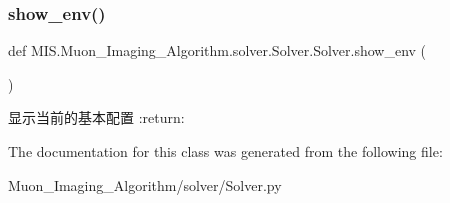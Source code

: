 \subsubsection{\texorpdfstring{show\+\_\+env()}{show\_env()}}
{\footnotesize\ttfamily def M\+I\+S.\+Muon\+\_\+\+Imaging\+\_\+\+Algorithm.\+solver.\+Solver.\+Solver.\+show\+\_\+env (\begin{DoxyParamCaption}{ }\end{DoxyParamCaption})\hspace{0.3cm}{\ttfamily [static]}}

\begin{DoxyVerb}显示当前的基本配置
:return:
\end{DoxyVerb}
 

The documentation for this class was generated from the following file\+:\begin{DoxyCompactItemize}
\item 
Muon\+\_\+\+Imaging\+\_\+\+Algorithm/solver/Solver.\+py\end{DoxyCompactItemize}
